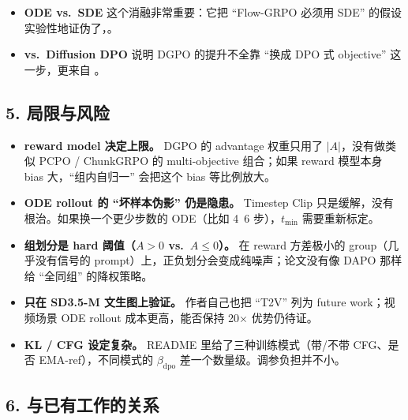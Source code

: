 \begin{itemize}[leftmargin=1.5em]
  \item \textbf{ODE vs.\ SDE} 这个消融非常重要：它把 ``Flow-GRPO 必须用 SDE'' 的假设实验性地证伪了，。
  \item \textbf{vs.\ Diffusion DPO} 说明 DGPO 的提升不全靠 ``换成 DPO 式 objective'' 这一步，更来自 。
\end{itemize}

\subsection{5. 局限与风险}

\begin{itemize}[leftmargin=1.5em]
  \item \textbf{reward model 决定上限。} DGPO 的 advantage 权重只用了 $|A|$，没有做类似 PCPO / ChunkGRPO 的 multi-objective 组合；如果 reward 模型本身 bias 大，``组内自归一'' 会把这个 bias 等比例放大。
  \item \textbf{ODE rollout 的 ``坏样本伪影'' 仍是隐患。} Timestep Clip 只是缓解，没有根治。如果换一个更少步数的 ODE（比如 4~6 步），$t_{\min}$ 需要重新标定。
  \item \textbf{组划分是 hard 阈值（$A>0$ vs.\ $A\le 0$）。} 在 reward 方差极小的 group（几乎没有信号的 prompt）上，正负划分会变成纯噪声；论文没有像 DAPO 那样给 ``全同组'' 的降权策略。
  \item \textbf{只在 SD3.5-M 文生图上验证。} 作者自己也把 ``T2V'' 列为 future work；视频场景 ODE rollout 成本更高，能否保持 20$\times$ 优势仍待证。
  \item \textbf{KL / CFG 设定复杂。} README 里给了三种训练模式（带/不带 CFG、是否 EMA-ref），不同模式的 $\beta_{\text{dpo}}$ 差一个数量级。调参负担并不小。
\end{itemize}

\subsection{6. 与已有工作的关系}

\begin{center}
\end{center}


